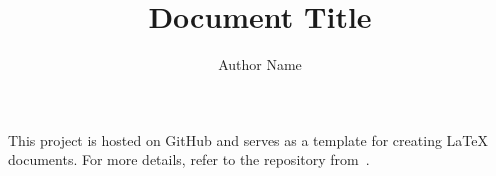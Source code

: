 \documentclass[twoside, 11pt]{report}
\author{Author Name}
\title{Document Title}
\begin{document}
\maketitle

\begin{abstract}
	
\end{abstract}

\newpage

\tableofcontents

\newpage

This project is hosted on GitHub and serves as a template for creating LaTeX documents. 
For more details, refer to the repository from~\cite{chang2025document}.

\appendix


% 

\newpage
\pagestyle{plain}
\printbibliography{}
\end{document}
